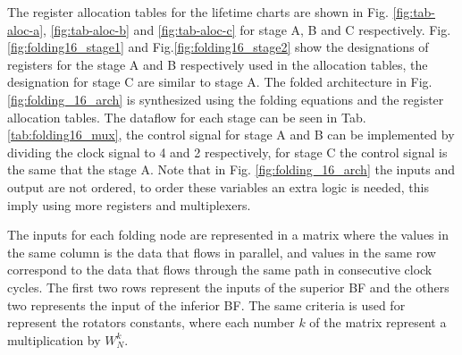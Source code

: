 \documentclass[journal,comsoc]{IEEEtran}
\begin{document}
The register allocation tables for the lifetime charts are shown in Fig. \ref{fig:tab-aloc-a}, \ref{fig:tab-aloc-b} and \ref{fig:tab-aloc-c} for stage A, B and C respectively. Fig.\ref{fig:folding16_stage1} and  Fig.\ref{fig:folding16_stage2} show the designations of registers for the stage A and B respectively used in the allocation tables, the designation for stage C are similar to stage A. The folded architecture in Fig.\ref{fig:folding_16_arch} is synthesized using the folding equations and the register allocation tables. The dataflow for each stage can be seen in Tab. \ref{tab:folding16_mux}, the control signal for stage A and B can be implemented by dividing the clock signal to 4 and 2 respectively, for stage C the control signal is the same that the stage A. 
Note that in Fig. \ref{fig:folding_16_arch} the inputs and output are not ordered, to order these variables an extra logic is needed, this imply using more registers and multiplexers.

The inputs for each folding node are represented in a matrix where the values in the same column is the data that flows in parallel, and values in the same row correspond to the data that flows through the same path in consecutive clock cycles. The first two rows represent the inputs of the superior BF and the others two represents the input of the inferior BF. The same criteria is used for represent the rotators constants, where each number $k$ of the matrix represent a multiplication by $W^k_N$.
\end{document}
